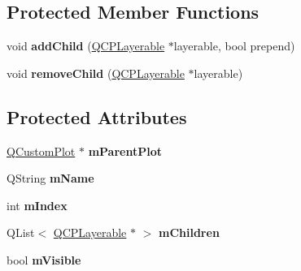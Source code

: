 \subsection*{Protected Member Functions}
\begin{DoxyCompactItemize}
\item 
\hypertarget{classQCPLayer_a57ce5e49364aa9122276d5df3b4a0ddc}{}void {\bfseries add\+Child} (\hyperlink{classQCPLayerable}{Q\+C\+P\+Layerable} $\ast$layerable, bool prepend)\label{classQCPLayer_a57ce5e49364aa9122276d5df3b4a0ddc}

\item 
\hypertarget{classQCPLayer_ac2f64ac7761650582d968d86670ef362}{}void {\bfseries remove\+Child} (\hyperlink{classQCPLayerable}{Q\+C\+P\+Layerable} $\ast$layerable)\label{classQCPLayer_ac2f64ac7761650582d968d86670ef362}

\end{DoxyCompactItemize}
\subsection*{Protected Attributes}
\begin{DoxyCompactItemize}
\item 
\hypertarget{classQCPLayer_a2f3374a7884bf403720cd1cf6f7ad1bb}{}\hyperlink{classQCustomPlot}{Q\+Custom\+Plot} $\ast$ {\bfseries m\+Parent\+Plot}\label{classQCPLayer_a2f3374a7884bf403720cd1cf6f7ad1bb}

\item 
\hypertarget{classQCPLayer_a91e6298183cb4b9dfd4efdfaf1ecc220}{}Q\+String {\bfseries m\+Name}\label{classQCPLayer_a91e6298183cb4b9dfd4efdfaf1ecc220}

\item 
\hypertarget{classQCPLayer_a122088bcab6cec76a52b75ce8606605b}{}int {\bfseries m\+Index}\label{classQCPLayer_a122088bcab6cec76a52b75ce8606605b}

\item 
\hypertarget{classQCPLayer_a704aa71bba469383c3a3c598c1ec0d28}{}Q\+List$<$ \hyperlink{classQCPLayerable}{Q\+C\+P\+Layerable} $\ast$ $>$ {\bfseries m\+Children}\label{classQCPLayer_a704aa71bba469383c3a3c598c1ec0d28}

\item 
\hypertarget{classQCPLayer_a264950deb08e589460c126c895a1e2b5}{}bool {\bfseries m\+Visible}\label{classQCPLayer_a264950deb08e589460c126c895a1e2b5}

\end{DoxyCompactItemize}

